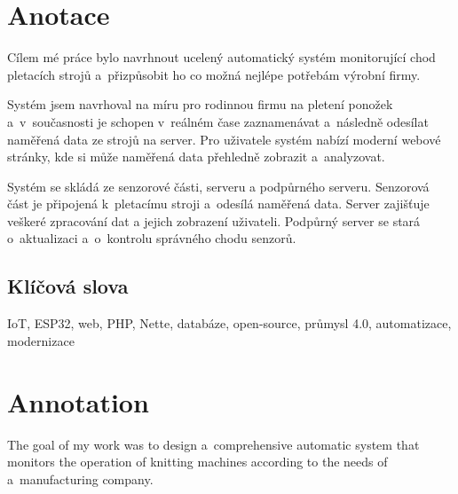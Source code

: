 \documentclass{template/socthesis}
\author{Jakub Andrýsek} %
\begin{document}

\maketitle %



\pagestyle{empty}

\section*{Anotace}
Cílem mé práce bylo navrhnout ucelený automatický systém monitorující chod pletacích strojů a~přizpůsobit ho co možná nejlépe potřebám výrobní firmy.

Systém jsem navrhoval na míru pro rodinnou firmu na pletení ponožek a~v sou\-čas\-nos\-ti je schopen v~reálném čase zaznamenávat a~následně odesílat naměřená data ze strojů na server. 
Pro uživatele systém nabízí moderní webové stránky, kde si může naměřená data přehledně zobrazit a~analyzovat.


Systém se skládá ze senzorové části, serveru a podpůrného serveru.
Senzorová část je připojená k~pletacímu stroji a~odesílá naměřená data.
Server zajišťuje veškeré zpracování dat a jejich zobrazení uživateli.
Podpůrný server se stará o~aktualizaci a~o~kontrolu správného chodu senzorů.


\subsection*{Klíčová slova}
IoT, ESP32, web, PHP, Nette, databáze, open-source, průmysl 4.0, automatizace, modernizace


\newpage %

\vspace{20mm}

\section*{Annotation}
The goal of my work was to design a~comprehensive automatic system that monitors the operation of knitting machines according to the needs of a~manufacturing company.
\end{document}
